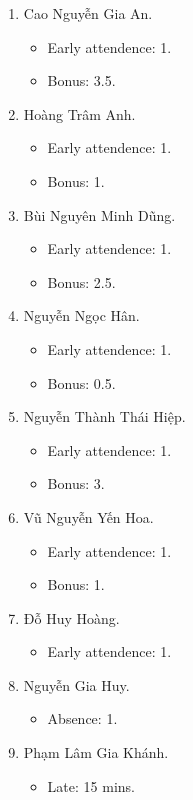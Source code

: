 \documentclass{article}
\begin{document}
\begin{enumerate}
	\item {\sc Cao Nguyễn Gia An.}
	\begin{itemize}
		\item Early attendence: 1.
		\item Bonus: 3.5.
	\end{itemize}
	\item {\sc Hoàng Trâm Anh.}
	\begin{itemize}
		\item Early attendence: 1.
		\item Bonus: 1.
	\end{itemize}
	\item {\sc Bùi Nguyên Minh Dũng.}
	\begin{itemize}
		\item Early attendence: 1.
		\item Bonus: 2.5.
	\end{itemize}
	\item {\sc Nguyễn Ngọc Hân.}
	\begin{itemize}
		\item Early attendence: 1.
		\item Bonus: 0.5.
	\end{itemize}
	\item {\sc Nguyễn Thành Thái Hiệp.}
	\begin{itemize}
		\item Early attendence: 1.
		\item Bonus: 3.
	\end{itemize}
	\item {\sc Vũ Nguyễn Yến Hoa.}
	\begin{itemize}
		\item Early attendence: 1.
		\item Bonus: 1.
	\end{itemize}
	\item {\sc Đỗ Huy Hoàng.}
	\begin{itemize}
		\item Early attendence: 1.
	\end{itemize}
	\item {\sc Nguyễn Gia Huy.}
	\begin{itemize}
		\item Absence: 1.
	\end{itemize}
	\item {\sc Phạm Lâm Gia Khánh.}
	\begin{itemize}
		\item Late: 15 mins.

\end{itemize}
\end{enumerate}
\end{document}
